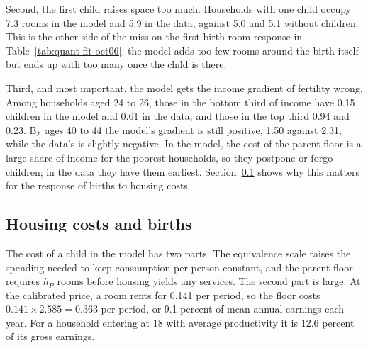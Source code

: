 Second, the first child raises space too much. Households with one child
occupy 7.3 rooms in the model and 5.9 in the data, against 5.0 and 5.1
without children. This is the other side of the miss on the first-birth room
response in Table~\ref{tab:quant-fit-oct06}: the model adds too few rooms
around the birth itself but ends up with too many once the child is there.

Third, and most important, the model gets the income gradient of fertility
wrong. Among households aged 24 to 26, those in the bottom third of income
have 0.15 children in the model and 0.61 in the data, and those in the top
third 0.94 and 0.23. By ages 40 to 44 the model's gradient is still positive,
1.50 against 2.31, while the data's is slightly negative. In the model, the
cost of the parent floor is a large share of income for the poorest
households, so they postpone or forgo children; in the data they have them
earliest. Section~\ref{sec:results-price} shows why this matters for the
response of births to housing costs.

\subsection{Housing costs and births}
\label{sec:results-price}

The cost of a child in the model has two parts. The equivalence scale raises
the spending needed to keep consumption per person constant, and the parent
floor requires $h_P$ rooms before housing yields any services. The second part
is large. At the calibrated price, a room rents for 0.141 per period, so the
floor costs $0.141\times2.585=0.363$ per period, or 9.1 percent of mean annual
earnings each year. For a household entering at 18 with average productivity
it is 12.6 percent of its gross earnings.

